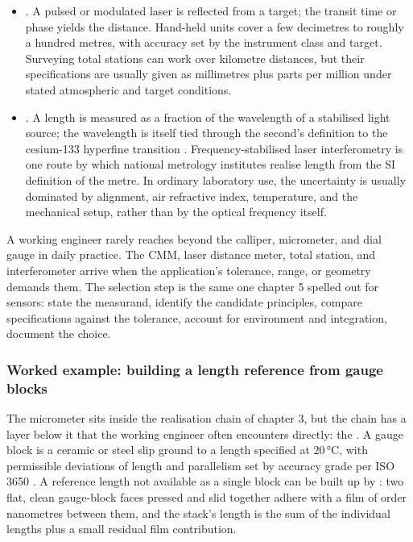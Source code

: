 \begin{itemize}[leftmargin=*]
    a single linear measurement and a fully dimensioned
    three-dimensional part.
  \item {}. A
    pulsed or modulated laser is reflected from a target; the
    transit time or phase yields the distance. Hand-held units cover
    a few decimetres to roughly a hundred metres, with accuracy set
    by the instrument class and target. Surveying total stations can
    work over kilometre distances, but their specifications are
    usually given as millimetres plus parts per million under stated
    atmospheric and target conditions.
  \item {}. A length is measured as a
    fraction of the wavelength of a stabilised light source; the
    wavelength is itself tied through the second's definition to the
    cesium-133 hyperfine transition \cite{std:bipm-si2019}.
    Frequency-stabilised laser interferometry is one route by which
    national metrology institutes realise length from the SI
    definition of the metre. In ordinary laboratory use, the
    uncertainty is usually dominated by alignment, air refractive
    index, temperature, and the mechanical setup, rather than by the
    optical frequency itself.
\end{itemize}

A working engineer rarely reaches beyond the calliper, micrometer,
and dial gauge in daily practice. The CMM, laser distance meter,
total station, and interferometer arrive when the application's
tolerance, range, or geometry demands them. The selection step is the
same one chapter 5 spelled out for sensors: state the measurand,
identify the candidate principles, compare specifications against the
tolerance, account for environment and integration, document the
choice.

\subsubsection*{Worked example: building a length reference from
gauge blocks}

The micrometer sits inside the realisation chain of chapter 3, but
the chain has a layer below it that the working engineer often
encounters directly: the . A gauge block is a
ceramic or steel slip ground to a length specified at $20 \,\si
{\degreeCelsius}$, with permissible deviations of length and
parallelism set by accuracy grade per ISO 3650 \cite{std:iso-3650}.
A reference length not available as a single block can be built up
by : two flat, clean gauge-block faces pressed and
slid together adhere with a film of order nanometres between them,
and the stack's length is the sum of the individual lengths plus a
small residual film contribution.

